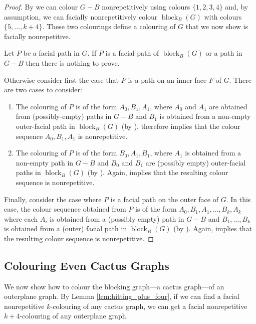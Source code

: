 \documentclass{cccg16}
\DeclareMathOperator{\block}{block}
\begin{document}
\begin{proof}
By  we can colour $G-B$ nonrepetitively using colours
$\{1,2,3,4\}$ and, by assumption, we can facially nonrepetitively colour
$\block_{B}(G)$ with colours $\{5,\dots, k+4\}$. These two colourings
define a colouring of $G$ that we now show is facially nonrepetitive.

Let $P$ be a facial path in $G$. If $P$ is a facial path of
$\block_{B}(G)$ or a path in $G-B$ then there is nothing to prove.

Otherwise consider first the case that $P$ is a path on an inner
face $F$ of $G$.   There are two cases to consider:
\begin{enumerate}
\item The colouring of $P$ is of the form $A_0,B_1,A_1$, where
  $A_0$ and $A_1$ are obtained from (possibly-empty) paths in $G-B$
  and $B_1$ is obtained from a non-empty outer-facial path in $\block_B(G)$
  (by ).   therefore implies that the
  colour sequence $A_0,B_1,A_1$ is nonrepetitive.

\item The colouring of $P$ is of the form $B_0,A_1,B_1$, where $A_1$
  is obtained from a non-empty path in $G-B$ and $B_0$ and $B_1$ are
  (possibly empty) outer-facial paths in $\block_B(G)$ (by ).
  Again,  implies that the resulting colour sequence
  is nonrepetitive.
\end{enumerate}

Finally, consider the case where $P$ is a facial path on the outer face
of $G$.  In this case, the colour sequence obtained from $P$ is of the
form $A_0,B_1,A_1,\ldots,B_k,A_k$ where each $A_i$ is obtained from a
(possibly empty) path in $G-B$ and $B_1,\ldots,B_k$ is obtained from
a (outer) facial path in $\block_B(G)$ (by ).  Again,
 implies that the resulting colour sequence is
nonrepetitive.
\end{proof}

\subsection{Colouring Even Cactus Graphs}

We now show how to colour the blocking graph---a cactus graph---of an
outerplane graph.  By Lemma \ref{lem:hitting_plus_four}, if we can find
a facial nonrepetitive $k$-colouring of any cactus graph, we can get a
facial nonrepetitive $k+4$-colouring of any outerplane graph.
\end{document}
